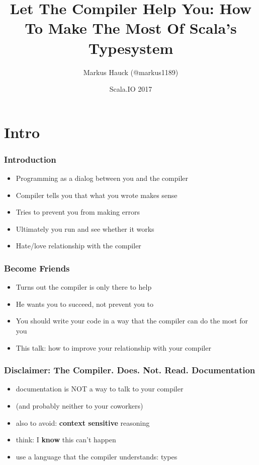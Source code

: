 \documentclass{beamer}
\title{Let The Compiler Help You: How To Make The Most Of Scala's Typesystem}
\author{Markus Hauck (@markus1189)}
\date{Scala.IO 2017}
\begin{document}
{
  \frame[plain]{\titlepage}
}

\section{Intro}
\label{sec:intro}

\begin{frame}
  \frametitle{Introduction}
  \begin{itemize}
  \item Programming as a dialog between you and the compiler
  \item Compiler tells you that what you wrote makes sense
  \item Tries to prevent you from making errors
  \item Ultimately you run and see whether it works
  \item Hate/love relationship with the compiler
  \end{itemize}
\end{frame}

\begin{frame}
  \frametitle{Become Friends}
  \begin{itemize}
  \item Turns out the compiler is only there to help
  \item He wants you to succeed, not prevent you to
  \item You should write your code in a way that the compiler can do
    the most for you
  \item This talk: how to improve your relationship with your compiler
  \end{itemize}
\end{frame}

\begin{frame}
  \frametitle{Disclaimer: The Compiler. Does. Not. Read. Documentation}
  \begin{itemize}
  \item documentation is NOT a way to talk to your compiler
  \item (and probably neither to your coworkers)
  \item also to avoid: \textbf{context sensitive} reasoning
  \item think: I \textbf{know} this can't happen
  \item use a language that the compiler understands: types
  \end{itemize}
\end{frame}
\end{document}
